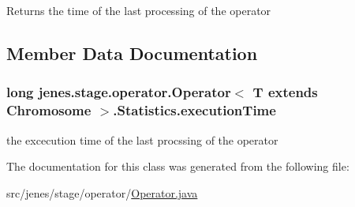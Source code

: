 \begin{DoxyReturn}{Returns}
the time of the last processing of the operator 
\end{DoxyReturn}


\subsection{Member Data Documentation}
\hypertarget{classjenes_1_1stage_1_1operator_1_1_operator_3_01_t_01extends_01_chromosome_01_4_1_1_statistics_a3e7fc955df9ca708795c24336b12f937}{
\subsubsection[{execution\-Time}]{\setlength{\rightskip}{0pt plus 5cm}long jenes.\-stage.\-operator.\-Operator$<$ T extends Chromosome $>$.Statistics.\-execution\-Time\hspace{0.3cm}{\ttfamily [protected]}}}\label{classjenes_1_1stage_1_1operator_1_1_operator_3_01_t_01extends_01_chromosome_01_4_1_1_statistics_a3e7fc955df9ca708795c24336b12f937}
the excecution time of the last procssing of the operator 

The documentation for this class was generated from the following file\-:\begin{DoxyCompactItemize}
\item 
src/jenes/stage/operator/\hyperlink{_operator_8java}{Operator.\-java}\end{DoxyCompactItemize}
